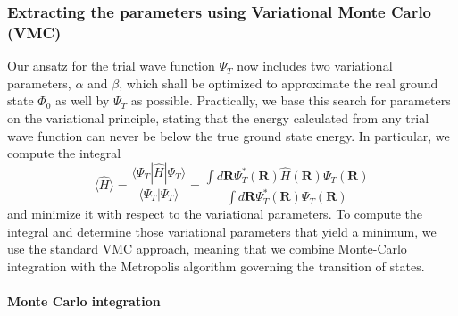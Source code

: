 \subsubsection{Extracting the parameters using Variational Monte Carlo (VMC)}
Our ansatz for the trial wave function $\Psi_T$ now includes two variational parameters, $\alpha$ and $\beta$, which shall be optimized to approximate the real ground state $\Phi_0$ as well by $\Psi_T$ as possible. Practically, we base this search for parameters on the variational principle, stating that the energy calculated from any trial wave function can never be below the true ground state energy. In particular, we compute
the integral 
\begin{equation*}
   \langle \hat H \rangle = 
    \frac{\langle\Psi_T|\hat{H}|\Psi_T\rangle}{\langle\Psi_T|\Psi_T\rangle} = 
   \frac{\int d\mathbf{R}\Psi^{\ast}_T(\mathbf{R})\hat H(\mathbf{R})\Psi_T(\mathbf{R})}
        {\int d\mathbf{R}\Psi^{\ast}_T(\mathbf{R})\Psi_T(\mathbf{R})}
\end{equation*}
and minimize it with respect to the variational parameters. To compute the integral
and determine those variational parameters that yield a minimum,
we use the standard VMC approach, meaning that we combine Monte-Carlo integration with the Metropolis algorithm governing the transition of states.

\paragraph{Monte Carlo integration}

